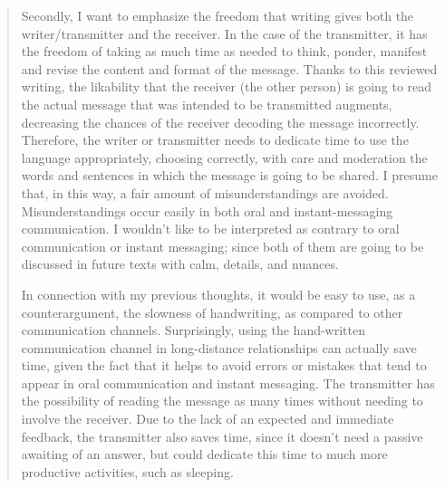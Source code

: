 \documentclass[]{book}
\begin{document}
\begin{quote}
Secondly, I want to emphasize the freedom that writing gives both the writer/transmitter and the receiver. In the case of the transmitter, it has the freedom of taking as much time as needed to think, ponder, manifest and revise the content and format of the message. Thanks to this reviewed writing, the likability that the receiver (the other person) is going to read the actual message that was intended to be transmitted augments, decreasing the chances of the receiver decoding the message incorrectly. Therefore, the writer or transmitter needs to dedicate time to use the language appropriately, choosing correctly, with care and moderation the words and sentences in which the message is going to be shared. I presume that, in this way, a fair amount of misunderstandings are avoided. Misunderstandings occur easily in both oral and instant-messaging communication. I wouldn't like to be interpreted as contrary to oral communication or instant messaging; since both of them are going to be discussed in future texts with calm, details, and nuances.

In connection with my previous thoughts, it would be easy to use, as a counterargument, the slowness of handwriting, as compared to other communication channels. Surprisingly, using the hand-written communication channel in long-distance relationships can actually save time, given the fact that it helps to avoid errors or mistakes that tend to appear in oral communication and instant messaging. The transmitter has the possibility of reading the message as many times without needing to involve the receiver. Due to the lack of an expected and immediate feedback, the transmitter also saves time, since it doesn't need a passive awaiting of an answer, but could dedicate this time to much more productive activities, such as sleeping.


\end{quote}
\end{document}
